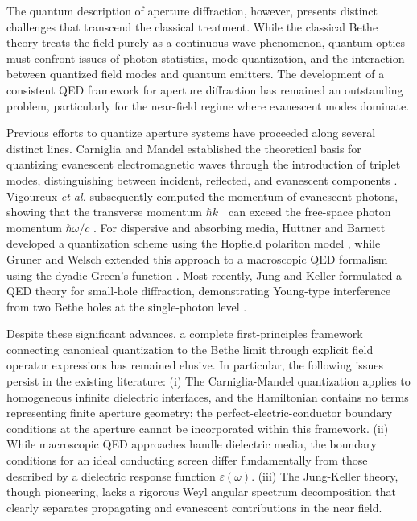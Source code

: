 \documentclass[%
 reprint,
 amsmath,amssymb,
 aps,
 floatfix,
]{revtex4-2}
\begin{document}
The quantum description of aperture diffraction, however, presents distinct challenges that transcend the classical treatment. While the classical Bethe theory treats the field purely as a continuous wave phenomenon, quantum optics must confront issues of photon statistics, mode quantization, and the interaction between quantized field modes and quantum emitters. The development of a consistent QED framework for aperture diffraction has remained an outstanding problem, particularly for the near-field regime where evanescent modes dominate.

Previous efforts to quantize aperture systems have proceeded along several distinct lines. Carniglia and Mandel established the theoretical basis for quantizing evanescent electromagnetic waves through the introduction of triplet modes, distinguishing between incident, reflected, and evanescent components \cite{Carniglia1971}. Vigoureux \textit{et al.} subsequently computed the momentum of evanescent photons, showing that the transverse momentum $\hbar k_\perp$ can exceed the free-space photon momentum $\hbar\omega/c$ \cite{Vigoureux1980}. For dispersive and absorbing media, Huttner and Barnett developed a quantization scheme using the Hopfield polariton model \cite{Huttner1992}, while Gruner and Welsch extended this approach to a macroscopic QED formalism using the dyadic Green's function \cite{Gruner1996}. Most recently, Jung and Keller formulated a QED theory for small-hole diffraction, demonstrating Young-type interference from two Bethe holes at the single-photon level \cite{Jung2017,Jung2021}.

Despite these significant advances, a complete first-principles framework connecting canonical quantization to the Bethe limit through explicit field operator expressions has remained elusive. In particular, the following issues persist in the existing literature: (i) The Carniglia-Mandel quantization applies to homogeneous infinite dielectric interfaces, and the Hamiltonian contains no terms representing finite aperture geometry; the perfect-electric-conductor boundary conditions at the aperture cannot be incorporated within this framework. (ii) While macroscopic QED approaches handle dielectric media, the boundary conditions for an ideal conducting screen differ fundamentally from those described by a dielectric response function $\varepsilon(\omega)$. (iii) The Jung-Keller theory, though pioneering, lacks a rigorous Weyl angular spectrum decomposition that clearly separates propagating and evanescent contributions in the near field.
\end{document}
